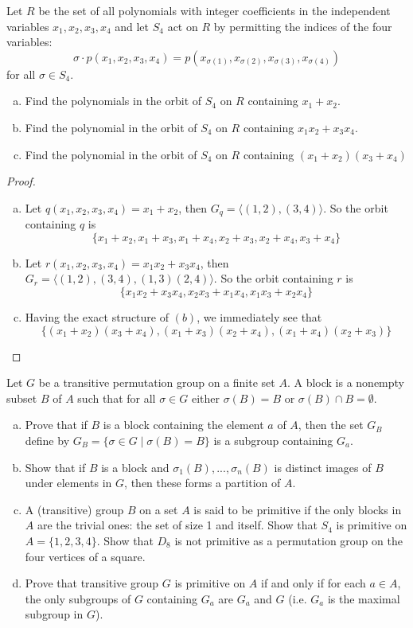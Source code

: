 \documentclass{article}
\newenvironment{problem}[2][Problem]{\begin{trivlist}
\item[\hskip \labelsep {\bfseries #1}\hskip \labelsep {\bfseries #2.}]}{\end{trivlist}}
\begin{document}
\begin{problem}{6}
    Let $R$ be the set of all polynomials with integer coefficients in the independent variables $x_1, x_2, x_3, x_4$ and let $S_4$ act on $R$ by permitting the indices of the four  variables:
    \[
    \sigma\cdot p(x_1, x_2, x_3, x_4)= p(x_{\sigma(1)}, x_{\sigma(2)}, x_{\sigma(3)}, x_{\sigma(4)})
    \]
    for all $\sigma \in S_4$.
    \begin{enumerate}[(a)]
        \item Find the polynomials in the orbit of $S_4$ on $R$ containing $x_1+x_2$.
        \item Find the polynomial in the orbit of $S_4$ on $R$ containing $x_1x_2+x_3x_4$.
        \item Find the polynomial in the orbit of $S_4$ on $R$ containing $(x_1+x_2)(x_3+x_4)$
    \end{enumerate}
\end{problem}
\begin{proof}
    \begin{enumerate}[(a)]
        \item Let $q(x_1, x_2, x_3, x_4)=x_1+x_2$, then $G_q = \langle(1, 2), (3, 4)\rangle$. So the orbit containing $q$ is \[\{x_1+x_2, x_1+x_3, x_1+x_4, x_2+x_3, x_2+x_4, x_3+x_4\}\]
        \item Let $r(x_1, x_2, x_3, x_4)=x_1x_2+x_3x_4$, then $G_r=\langle (1, 2), (3, 4), (1, 3)(2, 4)\rangle$. So the orbit containing $r$ is 
        \[
        \{x_1x_2+x_3x_4, x_2x_3+x_1x_4, x_1x_3+x_2x_4\}
        \]
        \item Having the exact structure of $(b)$, we immediately see that 
        \[
        \{(x_1+x_2)(x_3+x_4), (x_1+x_3)(x_2+x_4), (x_1+x_4)(x_2+x_3)\}
        \]
    \end{enumerate}
\end{proof}
\begin{problem}{7}
    Let $G$ be a transitive permutation group on a finite set $A$. A block is a nonempty subset $B$ of $A$ such that for all $\sigma \in G$ either $\sigma(B)=B$ or $\sigma(B)\cap B =\emptyset$.
    \begin{enumerate}[(a)]
        \item Prove that if $B$ is a block containing the element $a$ of $A$, then the set $G_B$ define by $G_B =\{\sigma \in G \mid \sigma(B) =B\}$ is a subgroup containing $G_a$.
        \item Show that if $B$ is a block and $\sigma_1(B), ..., \sigma_n(B)$ is distinct images of $B$ under elements in $G$, then these forms a partition of $A$.
        \item A (transitive) group $B$ on a set $A$ is said to be primitive if the only blocks in $A$ are the trivial ones: the set of size 1 and itself. Show that $S_4$ is primitive on $A=\{1, 2, 3, 4\}$. Show that $D_8$ is not primitive as a permutation group on the four vertices of a square.
        \item Prove that transitive group $G$ is primitive on $A$ if and only if for each $a \in A$, the only subgroups of $G$ containing $G_a$ are $G_a$ and $G$ (i.e. $G_a$ is the maximal subgroup in $G$).
    \end{enumerate}
\end{problem}
\end{document}
